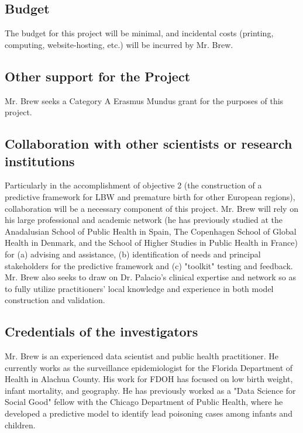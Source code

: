 \documentclass{article}
\begin{document}
\begin{multicols}{2}
\subsection*{Budget}

The budget for this project will be minimal, and incidental costs (printing, computing, website-hosting, etc.) will be incurred by Mr. Brew.  

\subsection*{Other support for the Project}

Mr. Brew seeks a Category A Erasmus Mundus grant for the purposes of this project.

\subsection*{Collaboration with other scientists or research institutions}

Particularly in the accomplishment of objective 2 (the construction of a predictive framework for LBW and premature birth for other European regions), collaboration will be a necessary component of this project.  Mr. Brew will rely on his large professional and academic network (he has previously studied at the Anadalusian School of Public Health in Spain, The Copenhagen School of Global Health in Denmark, and the School of Higher Studies in Public Health in France) for (a) advising and assistance, (b) identification of needs and principal stakeholders for the predictive framework and (c) "toolkit" testing and feedback.  Mr. Brew also seeks to draw on Dr. Palacio's clinical expertise and network so as to fully utilize practitioners' local knowledge and experience in both model construction and validation.

\subsection*{Credentials of the investigators}

Mr. Brew is an experienced data scientist and public health practitioner.  He currently works as the surveillance epidemiologist for the Florida Department of Health in Alachua County.  His work for FDOH has focused on low birth weight, infant mortality, and geography.  He has previously worked as a "Data Science for Social Good" fellow with the Chicago Department of Public Health, where he developed a predictive model to identify lead poisoning cases among infants and children. \\


\end{multicols}
\end{document}
